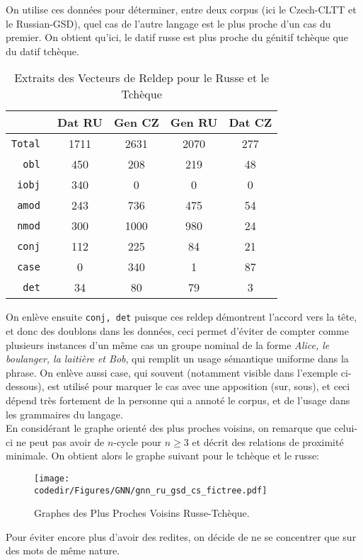     On utilise ces données pour déterminer, entre deux corpus (ici le Czech-CLTT et le Russian-GSD), quel cas de l'autre langage est le plus proche d'un cas du premier.
    On obtient qu'ici, le datif russe est plus proche du génitif tchèque que du datif tchèque.
    \begin{table}[H]
	    \centering
    \begin{tabular}{>{\tt}r|cccc}
        \toprule
        &Dat RU & Gen CZ & Gen RU & Dat CZ\\
        \midrule
        Total & 1711 & 2631 & 2070 & 277\\
        obl & 450 & 208 & 219 & 48\\
        iobj & 340 & 0 & 0 & 0\\
        amod & 243 & 736 & 475 & 54\\
        nmod & 300 & 1000 & 980 & 24\\
        conj & 112 & 225 & 84 & 21\\
        case & 0 & 340 & 1 & 87\\
        det & 34 & 80 & 79 & 3\\
        \bottomrule
    \end{tabular}
	\caption{Extraits des Vecteurs de Reldep pour le Russe et le Tchèque}
    \end{table}
    On enlève ensuite \texttt{conj, det} puisque ces reldep démontrent l'accord vers la tête, et donc des doublons dans les données, ceci permet d'éviter de compter comme plusieurs instances d'un même cas un groupe nominal de la forme \emph{Alice, le boulanger, la laitière et Bob}, qui remplit un usage sémantique uniforme dans la phrase.
    On enlève aussi case, qui souvent (notamment visible dans l'exemple ci-dessous), est utilisé pour marquer le cas avec une apposition (sur, sous), et ceci dépend très fortement de la personne qui a annoté le corpus, et de l'usage dans les grammaires du langage.\\
    En considérant le graphe orienté des plus proches voisins, on remarque que celui-ci ne peut pas avoir de $n$-cycle pour $n \geq 3$ et décrit des relations de proximité minimale.
    On obtient alors le graphe suivant pour le tchèque et le russe:
    \begin{figure}[H]
	    \centering
	    \texttt{[image: \\codedir/Figures/GNN/gnn\_ru\_gsd\_cs\_fictree.pdf]}
	    \caption{Graphes des Plus Proches Voisins Russe-Tchèque.}
    \end{figure}
    Pour éviter encore plus d'avoir des redites, on décide de ne se concentrer que sur des mots de même nature.

